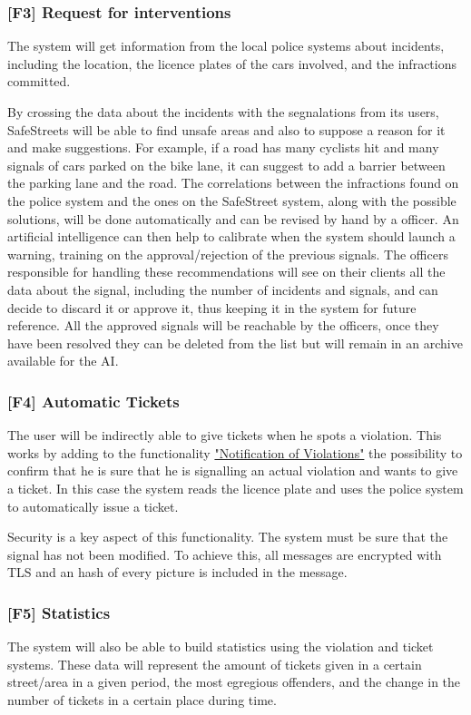\subsubsection[Request for interventions]{[F3] Request for interventions\hypertarget{sec:f3}{}}
\label{sec:request_for_interventions}
The system will get information from the local police systems about incidents, including the location, the licence plates of the cars involved, and the infractions committed.

By crossing the data about the incidents with the segnalations from its users, SafeStreets will be able to find unsafe areas and also to suppose a reason for it and make suggestions.
For example, if a road has many cyclists hit and many signals of cars parked on the bike lane, it can suggest to add a barrier between the parking lane and the road.
The correlations between the infractions found on the police system and the ones on the SafeStreet system, along with the possible solutions, will be done automatically and can be revised by hand by a officer.
An artificial intelligence can then help to calibrate when the system should launch a warning, training on the approval/rejection of the previous signals.
\clearpage
The officers responsible for handling these recommendations will see on their clients all the data about the signal,
including the number of incidents and signals, and can decide to discard it or approve it, thus keeping it in the system for future reference.
All the approved signals will be reachable by the officers, once they have been resolved they can be deleted from the list but will remain in an archive available for the AI.


\subsubsection[Automatic Tickets]{[F4] Automatic Tickets\hypertarget{sec:f4}{}}
\label{sec:automatic_tickets}
The user will be indirectly able to give tickets when he spots a violation. This works by adding to the functionality
\hyperref[sec:notification_of_violations]{"Notification of Violations"}
the possibility to confirm that he is sure that he is signalling an actual violation and wants to give a ticket.
In this case the system reads the licence plate and uses the police system to automatically issue a ticket.

Security is a key aspect of this functionality. The system must be sure that the signal has not been modified.
To achieve this, all messages are encrypted with TLS and an hash of every picture is included in the message.

\subsubsection[Statistics]{[F5] Statistics\hypertarget{sec:f5}{}}
The system will also be able to build statistics using the violation and ticket systems.
These data will represent the amount of tickets given in a certain street/area in a given period, the most egregious offenders, and the change in the number of tickets in a certain place during time.
\clearpage